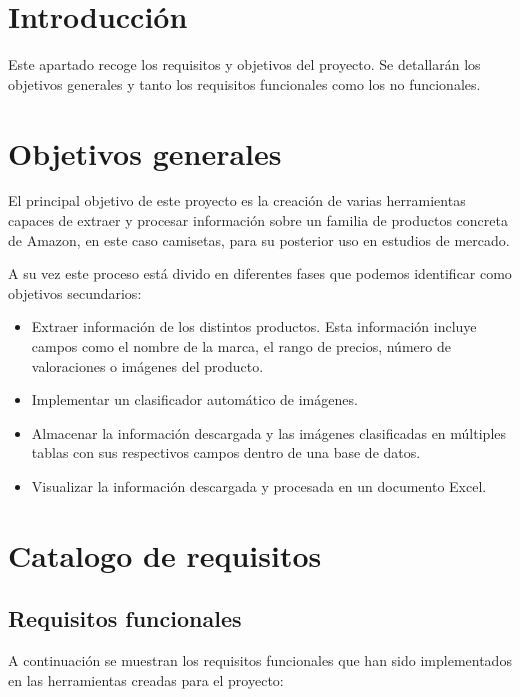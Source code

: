 
\section{Introducción}
 
 Este apartado recoge los requisitos y objetivos del proyecto. Se detallarán los objetivos generales y tanto los requisitos funcionales como los no funcionales.

\section{Objetivos generales}

El principal objetivo de este proyecto es la creación de varias herramientas capaces de extraer y procesar información sobre un familia de productos concreta de Amazon, en este caso camisetas, para su posterior uso en estudios de mercado.

A su vez este proceso está divido en diferentes fases que podemos identificar como objetivos secundarios:

\begin{itemize}
	\item Extraer información de los distintos productos. Esta información incluye campos como el nombre de la marca, el rango de precios, número de valoraciones o imágenes del producto.
	\item Implementar un clasificador automático de imágenes.
	\item Almacenar la información descargada y las imágenes clasificadas en múltiples tablas con sus respectivos campos dentro de una base de datos.
	\item Visualizar la información descargada y procesada en un documento Excel.
\end{itemize}

\section{Catalogo de requisitos}

\subsection{Requisitos funcionales}
A continuación se muestran los requisitos funcionales que han sido implementados en las herramientas creadas para el proyecto:

